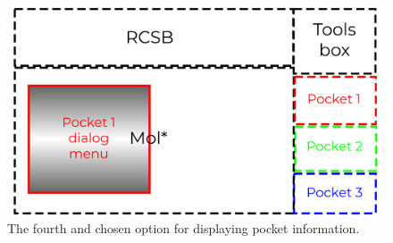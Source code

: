 \begin{figure}
	\centering
	\includegraphics[width=1\linewidth]{img/dialog_4-svg.pdf}
	\caption{The fourth and chosen option for displaying pocket information.}
	\label{fig:dialog-4}
\end{figure}